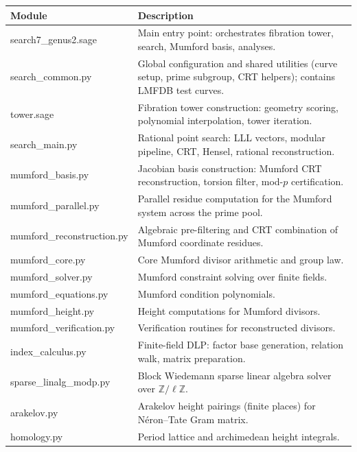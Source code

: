 \documentclass[11pt, a4paper]{article}
\begin{document}
\begin{table}[h]
    \centering
    \renewcommand{\arraystretch}{1.2}
    \begin{tabularx}{\textwidth}{>{\ttfamily}p{} X}
        \toprule
        \textbf{Module} & \textbf{Description} \\
        \midrule
        search7\_genus2.sage & Main entry point: orchestrates fibration tower, search, Mumford basis, analyses. \\
        search\_common.py & Global configuration and shared utilities (curve setup, prime subgroup, CRT helpers); contains LMFDB test curves. \\
        tower.sage & Fibration tower construction: geometry scoring, polynomial interpolation, tower iteration. \\
        search\_main.py & Rational point search: LLL vectors, modular pipeline, CRT, Hensel, rational reconstruction. \\
        mumford\_basis.py & Jacobian basis construction: Mumford CRT reconstruction, torsion filter, mod-$p$ certification. \\
        mumford\_parallel.py & Parallel residue computation for the Mumford system across the prime pool. \\
        mumford\_reconstruction.py & Algebraic pre-filtering and CRT combination of Mumford coordinate residues. \\
        mumford\_core.py & Core Mumford divisor arithmetic and group law. \\
        mumford\_solver.py & Mumford constraint solving over finite fields. \\
        mumford\_equations.py & Mumford condition polynomials. \\
        mumford\_height.py & Height computations for Mumford divisors. \\
        mumford\_verification.py & Verification routines for reconstructed divisors. \\
        index\_calculus.py & Finite-field DLP: factor base generation, relation walk, matrix preparation. \\
        sparse\_linalg\_modp.py & Block Wiedemann sparse linear algebra solver over $\mathbb{Z}/\ell\mathbb{Z}$. \\
        arakelov.py & Arakelov height pairings (finite places) for N\'eron--Tate Gram matrix. \\
        homology.py & Period lattice and archimedean height integrals. \\

\end{tabularx}
\end{table}
\end{document}

